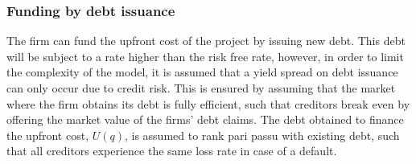 \documentclass[../main.tex]{subfiles}
\begin{document}
    \subsubsection{Funding by debt issuance}
        The firm can fund the upfront cost of the project by issuing new debt.
        This debt will be subject to a rate higher than the risk free rate, 
        however, in order to limit the complexity of the model, 
        it is assumed that a yield spread on debt issuance can only occur due to credit risk. 
        This is ensured by assuming that the market where the firm obtains its debt is fully efficient, 
        such that creditors break even by offering the market value of the firms' debt claims.
        The debt obtained to finance the upfront cost, $U(q)$, is assumed to rank pari passu with existing debt, 
        such that all creditors experience the same loss rate in case of a default.
\end{document}
